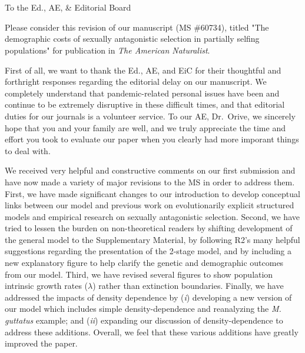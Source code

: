 \documentclass[11pt]{article}
\begin{document}




\section*{}
\noindent To the Ed., AE, \& Editorial Board
\bigskip

\noindent Please consider this revision of our manuscript (MS \#60734), titled "The demographic costs of sexually antagonistic selection in partially selfing populations" for publication in \textit{The American Naturalist}. 
\bigskip

\noindent First of all, we want to thank the Ed., AE, and EiC for their thoughtful and forthright responses regarding the editorial delay on our manuscript. We completely understand that pandemic-related personal issues have been and continue to be extremely disruptive in these difficult times, and that editorial duties for our journals is a volunteer service. To our AE, Dr.~Orive, we sincerely hope that you and your family are well, and we truly appreciate the time and effort you took to evaluate our paper when you clearly had more imporant things to deal with.
\bigskip

\noindent We received very helpful and constructive comments on our first submission and have now made a variety of major revisions to the MS in order to address them. First, we have made significant changes to our introduction to develop conceptual links between our model and previous work on evolutionarily explicit structured models and empirical research on sexually antagonistic selection. Second, we have tried to lessen the burden on non-theoretical readers by shifting development of the general model to the Supplementary Material, by following R2's many helpful suggestions regarding the presentation of the 2-stage model, and by including a new explanatory figure to help clarify the genetic and demographic outcomes from our model. Third, we have revised several figures to show population intrinsic growth rates ($\lambda$) rather than extinction boundaries. Finally, we have addressed the impacts of density dependence by ({\itshape i}) developing a new version of our model which includes simple density-dependence and reanalyzing the {\itshape M. guttatus} example; and ({\itshape ii}) expanding our discussion of density-dependence to address these additions. Overall, we feel that these various additions have greatly improved the paper. 
\bigskip
\end{document}
